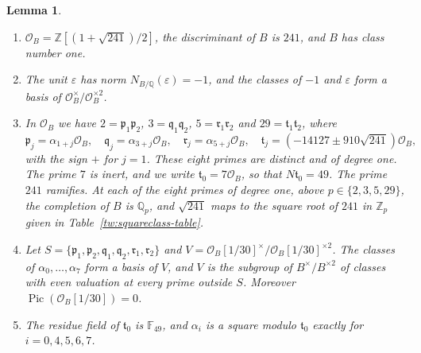 \documentclass[11pt]{amsart}
\numberwithin{equation}{section}
\newtheorem{lemma}[equation]{Lemma}
\theoremstyle{definition}
\theoremstyle{remark}
\DeclareMathOperator{\Pic}{Pic}
\newcommand{\Q}{\mathbb Q}
\newcommand{\Z}{\mathbb Z}
\begin{document}
\begin{lemma}\label{tw:base}
\begin{enumerate}
\item[(a)] $\mathcal O_B=\Z[(1+\sqrt{241})/2]$, the discriminant of $B$ is
 $241$, and $B$ has class number one.
\item[(b)] The unit $\varepsilon$ has norm $N_{B/\Q}(\varepsilon)=-1$, and the
 classes of $-1$ and $\varepsilon$ form a basis of
 $\mathcal O_B^\times/\mathcal O_B^{\times2}$.
\item[(c)] In $\mathcal O_B$ we have $2=\mathfrak p_1\mathfrak p_2$,
 $3=\mathfrak q_1\mathfrak q_2$, $5=\mathfrak r_1\mathfrak r_2$ and
 $29=\mathfrak t_1\mathfrak t_2$, where
 \[
  \mathfrak p_j=\alpha_{1+j}\mathcal O_B,\quad
  \mathfrak q_j=\alpha_{3+j}\mathcal O_B,\quad
  \mathfrak r_j=\alpha_{5+j}\mathcal O_B,\quad
  \mathfrak t_j=(-14127\pm910\sqrt{241})\mathcal O_B,
 \]
 with the sign $+$ for $j=1$. These eight primes are distinct and of degree
 one. The prime $7$ is inert, and we write $\mathfrak t_0=7\mathcal O_B$, so
 that $N\mathfrak t_0=49$. The prime $241$ ramifies. At each of the eight
 primes of degree one, above $p\in\{2,3,5,29\}$, the completion of $B$ is
 $\Q_p$, and $\sqrt{241}$ maps to the square root of $241$ in $\Z_p$ given in
 Table~\ref{tw:squareclass-table}.
\item[(d)] Let $S=\{\mathfrak p_1,\mathfrak p_2,\mathfrak q_1,\mathfrak q_2,\mathfrak r_1,\mathfrak r_2\}$
 and $V=\mathcal O_B[1/30]^\times/\mathcal O_B[1/30]^{\times2}$. The classes
 of $\alpha_0,\dots,\alpha_7$ form a basis of $V$, and $V$ is the subgroup of
 $B^\times/B^{\times2}$ of classes with even valuation at every prime outside
 $S$. Moreover $\Pic(\mathcal O_B[1/30])=0$.
\item[(e)] The residue field of $\mathfrak t_0$ is $\mathbb F_{49}$, and
 $\alpha_i$ is a square modulo $\mathfrak t_0$ exactly for $i=0,4,5,6,7$.
\end{enumerate}
\end{lemma}
\end{document}
